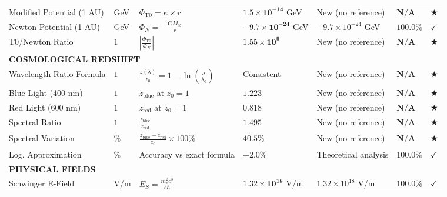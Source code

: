 \documentclass[12pt,a4paper]{article}
\newcommand{\kappaP}{\kappa}
\newcommand{\redshift}{z}
\newcommand{\checked}{\checkmark}
\begin{document}
\begin{landscape}
\begin{longtable}{p{5.8cm}p{2cm}p{4.2cm}p{3.8cm}p{3.8cm}p{2.0cm}p{1cm}}
			Modified Potential (1 AU) & GeV & $\Phi_{\text{T0}} = \kappaP \times r$ & $\mathbf{1.5 \times 10^{-14}}$ GeV & New (no reference) & $\mathbf{N/A}$ & $\bigstar$ \\
			
			Newton Potential (1 AU) & GeV & $\Phi_N = -\frac{GM_{\odot}}{r}$ & $\mathbf{-9.7 \times 10^{-24}}$ GeV & $-9.7 \times 10^{-24}$ GeV & $\mathbf{100.0\%}$ & $\checked$ \\
			
			T0/Newton Ratio & $1$ & $\left|\frac{\Phi_{\text{T0}}}{\Phi_N}\right|$ & $\mathbf{1.55 \times 10^{9}}$ & New (no reference) & $\mathbf{N/A}$ & $\bigstar$ \\
			
			\multicolumn{7}{l}{\textbf{COSMOLOGICAL REDSHIFT}} \\
			\midrule
			Wavelength Ratio Formula & $1$ & $\frac{\redshift(\lambda)}{\redshift_0} = 1 - \ln\left(\frac{\lambda}{\lambda_0}\right)$ & Consistent & New (no reference) & $\mathbf{N/A}$ & $\bigstar$ \\
			
			Blue Light (400 nm) & $1$ & $\redshift_{\text{blue}}$ at $\redshift_0 = 1$ & $\mathbf{1.223}$ & New (no reference) & $\mathbf{N/A}$ & $\bigstar$ \\
			
			Red Light (600 nm) & $1$ & $\redshift_{\text{red}}$ at $\redshift_0 = 1$ & $\mathbf{0.818}$ & New (no reference) & $\mathbf{N/A}$ & $\bigstar$ \\
			
			Spectral Ratio & $1$ & $\frac{\redshift_{\text{blue}}}{\redshift_{\text{red}}}$ & $\mathbf{1.495}$ & New (no reference) & $\mathbf{N/A}$ & $\bigstar$ \\
			
			Spectral Variation & $\%$ & $\frac{\redshift_{\text{blue}} - \redshift_{\text{red}}}{\redshift_0} \times 100\%$ & $\mathbf{40.5\%}$ & New (no reference) & $\mathbf{N/A}$ & $\bigstar$ \\
			
			Log. Approximation & $\%$ & Accuracy vs exact formula & $\mathbf{\pm 2.0\%}$ & Theoretical analysis & $\mathbf{100.0\%}$ & $\checked$ \\
			
			\multicolumn{7}{l}{\textbf{PHYSICAL FIELDS}} \\
			\midrule
			Schwinger E-Field & V/m & $E_S = \frac{m_e^2 c^3}{e\hbar}$ & $\mathbf{1.32 \times 10^{18}}$ V/m & $1.32 \times 10^{18}$ V/m & $\mathbf{100.0\%}$ & $\checked$ \\
			

\end{longtable}
\end{landscape}
\end{document}
